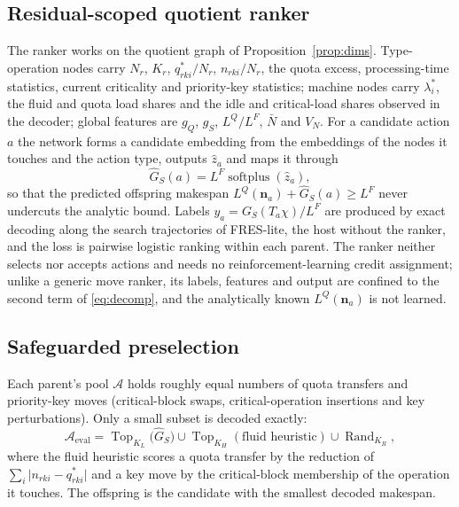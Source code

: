 \subsection{Residual-scoped quotient ranker}\label{sec:ranker}
The ranker works on the quotient graph of Proposition~\ref{prop:dims}. Type-operation nodes carry $N_r$, $K_r$,
$q^*_{rki}/N_r$, $n_{rki}/N_r$, the quota excess, processing-time statistics, current criticality and priority-key
statistics; machine nodes carry $\lambda^*_i$, the fluid and quota load shares and the idle and critical-load shares
observed in the decoder; global features are $g_Q$, $g_S$, $L^Q/L^F$, $\bar N$ and $V_N$. For a candidate action $a$ the
network forms a candidate embedding from the embeddings of the nodes it touches and the action type, outputs $\hat z_a$
and maps it through
\begin{equation}
\hat G_S(a) = L^F \operatorname{softplus}(\hat z_a), \label{eq:softplus}
\end{equation}
so that the predicted offspring makespan $L^Q(\mathbf{n}_a) + \hat G_S(a) \ge L^F$ never undercuts the analytic bound.
Labels $y_a = G_S(T_a\chi)/L^F$ are produced by exact decoding along the search trajectories of FRES-lite, the host without
the ranker, and the loss is pairwise logistic ranking within each parent. The ranker neither selects nor accepts actions
and needs no reinforcement-learning credit assignment; unlike a generic move ranker, its labels, features and output are
confined to the second term of \eqref{eq:decomp}, and the analytically known $L^Q(\mathbf{n}_a)$ is not learned.

\subsection{Safeguarded preselection}\label{sec:safeguard}
Each parent's pool $\mathcal{A}$ holds roughly equal numbers of quota transfers and priority-key moves (critical-block swaps,
critical-operation insertions and key perturbations). Only a small subset is decoded exactly:
\begin{equation}
\mathcal{A}_{\mathrm{eval}} = \operatorname{Top}_{K_L}\bigl(\hat G_S\bigr) \cup \operatorname{Top}_{K_H}(\text{fluid heuristic}) \cup \operatorname{Rand}_{K_R}, \label{eq:union}
\end{equation}
where the fluid heuristic scores a quota transfer by the reduction of $\sum_i \lvert n_{rki} - q^*_{rki}\rvert$ and a key
move by the critical-block membership of the operation it touches. The offspring is the candidate with the smallest decoded
makespan.

